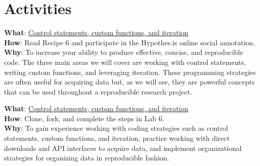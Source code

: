 \documentclass[
  letterpaper,
]{latex/krantz}
\begin{document}
\hypertarget{activities-4}{%
\section*{Activities}\label{activities-4}}

\begin{tcolorbox}[enhanced jigsaw, opacitybacktitle=0.6, breakable, colframe=quarto-callout-tip-color-frame, arc=.35mm, left=2mm, leftrule=.75mm, title=\textcolor{quarto-callout-tip-color}{\faLightbulb}\hspace{0.5em}{Recipe}, opacityback=0, colback=white, toptitle=1mm, rightrule=.15mm, titlerule=0mm, bottomtitle=1mm, bottomrule=.15mm, coltitle=black, colbacktitle=quarto-callout-tip-color!10!white, toprule=.15mm]
\textbf{What}:
\href{https://lin380.github.io/tadr/articles/recipe_6.html}{Control
statements, custom functions, and iteration}\\
\textbf{How}: Read Recipe 6 and participate in the Hypothes.is online
social annotation.\\
\textbf{Why}: To increase your ability to produce effective, concise,
and reproducible code. The three main areas we will cover are working
with control statements, writing custom functions, and leveraging
iteration. These programming strategies are often useful for acquiring
data but, as we will see, they are powerful concepts that can be used
throughout a reproducible research project.
\end{tcolorbox}

\begin{tcolorbox}[enhanced jigsaw, opacitybacktitle=0.6, breakable, colframe=quarto-callout-tip-color-frame, arc=.35mm, left=2mm, leftrule=.75mm, title=\textcolor{quarto-callout-tip-color}{\faLightbulb}\hspace{0.5em}{Lab}, opacityback=0, colback=white, toptitle=1mm, rightrule=.15mm, titlerule=0mm, bottomtitle=1mm, bottomrule=.15mm, coltitle=black, colbacktitle=quarto-callout-tip-color!10!white, toprule=.15mm]
\textbf{What}: \href{https://github.com/lin380/lab_6}{Control
statements, custom functions, and iteration}\\
\textbf{How}: Clone, fork, and complete the steps in Lab 6.\\
\textbf{Why}: To gain experience working with coding strategies such as
control statements, custom functions, and iteration, practice working
with direct downloads and API interfaces to acquire data, and implement
organizational strategies for organizing data in reproducible fashion.
\end{tcolorbox}
\end{document}
